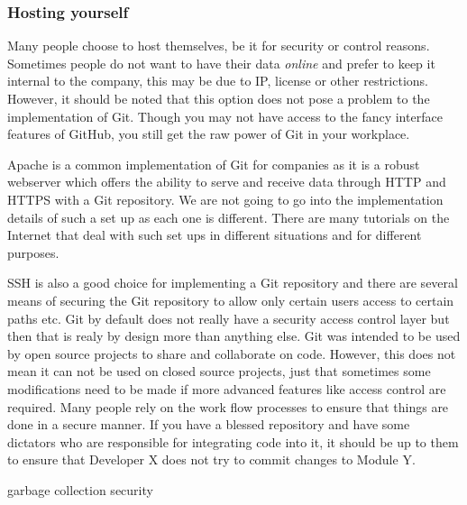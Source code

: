 \subsubsection{Hosting yourself}
Many people choose to host themselves, be it for security or control reasons.
Sometimes people do not want to have their data \emph{online} and prefer to keep it internal to the company, this may be due to IP, license or other restrictions.
However, it should be noted that this option does not pose a problem to the implementation of Git.
Though you may not have access to the fancy interface features of GitHub, you still get the raw power of Git in your workplace.

Apache is a common implementation of Git for companies as it is a robust webserver which offers the ability to serve and receive data through HTTP and HTTPS with a Git repository.
We are not going to go into the implementation details of such a set up as each one is different.
There are many tutorials on the Internet that deal with such set ups in different situations and for different purposes.

SSH is also a good choice for implementing a Git repository and there are several means of securing the Git repository to allow only certain users access to certain paths etc.
Git by default does not really have a security access control layer but then that is realy by design more than anything else.
Git was intended to be used by open source projects to share and collaborate on code.
However, this does not mean it can not be used on closed source projects, just that sometimes some modifications need to be made if more advanced features like access control are required.
Many people rely on the work flow processes to ensure that things are done in a secure manner.
If you have a blessed repository and have some dictators who are responsible for integrating code into it, it should be up to them to ensure that Developer X does not try to commit changes to Module Y.





garbage collection
security
